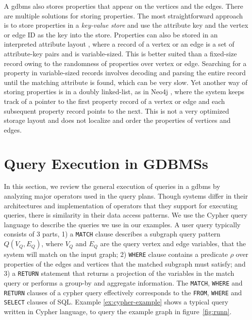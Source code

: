 A \gls{gdbms} also stores properties that appear on the vertices and the edges. There are multiple solutions for storing properties. The most straightforward approach is to store properties in a \emph{key-value store} \cite{dgraph} and use the attribute key and the vertex or edge ID as the key into the store. Properties can also be stored in an interpreted attribute layout \cite{beckmann:sparse}, where a record of a vertex or an edge is a set of attribute-key pairs and is variable-sized. This is better suited than a fixed-size record owing to the randomness of properties over vertex or edge. Searching for a property in variable-sized records involves decoding and parsing the entire record until the matching attribute is found, which can be very slow. Yet another way of storing properties is in a doubly linked-list, as in Neo4j \cite{neo4j}, where the system keeps track of a pointer to the first property record of a vertex or edge and each subsequent property record points to the next. This is not a very optimized storage layout and does not localize and order the properties of vertices and edges. 

\section{Query Execution in GDBMSs}
\label{sec:operators}

In this section, we review the general execution of queries in a \gls{gdbms} by analyzing major operators used in the query plans. Though systems differ in their architectures and implementation of operators that they support for executing queries, there is similarity in their data access patterns. We use the Cypher query language \cite{cypher} to describe the queries we use in our examples. A user query typically consists of 3 parts, 1) a \texttt{MATCH} clause describes a subgraph query pattern $Q(V_Q, E_Q)$, where $V_Q$ and $E_Q$ are the query vertex and edge variables, that the system will match on the input graph; 2) \texttt{WHERE} clause contains a predicate $\rho$ over properties of the edges and vertices that the matched subgraph must satisfy; and 3) a \texttt{RETURN} statement that returns a projection of the variables in the match query or performs a group-by and aggregate information. The \texttt{MATCH}, \texttt{WHERE} and \texttt{RETURN} clauses of a cypher query effectively corresponds to the \texttt{FROM}, \texttt{WHERE} and \texttt{SELECT} clauses of SQL. Example \ref{ex:cypher-example} shows a typical query written in Cypher language, to query the example graph in figure~\ref{fig:runn}.

